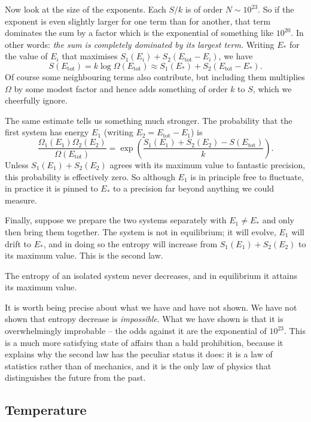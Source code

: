 \documentclass[a4paper]{scrartcl}
\begin{document}
Now look at the size of the exponents. Each $S/k$ is of order $N \sim 10^{23}$. So if the exponent is even slightly larger for one term than for another, that term dominates the sum by a factor which is the exponential of something like $10^{20}$. In other words: \emph{the sum is completely dominated by its largest term.} Writing $E_*$ for the value of $E_i$ that maximises $S_1(E_i) + S_2(E_{\mathrm{tot}} - E_i)$, we have
$$
S(E_{\mathrm{tot}}) = k\log \Omega(E_{\mathrm{tot}}) \approx S_1(E_*) + S_2(E_{\mathrm{tot}} - E_*).
$$
Of course some neighbouring terms also contribute, but including them multiplies $\Omega$ by some modest factor and hence adds something of order $k$ to $S$, which we cheerfully ignore.

The same estimate tells us something much stronger. The probability that the first system has energy $E_1$ (writing $E_2 = E_{\mathrm{tot}} - E_1$) is
$$
\frac{\Omega_1(E_1)\Omega_2(E_2)}{\Omega(E_{\mathrm{tot}})} = \exp\left( \frac{S_1(E_1) + S_2(E_2) - S(E_{\mathrm{tot}})}{k} \right).
$$
Unless $S_1(E_1) + S_2(E_2)$ agrees with its maximum value to fantastic precision, this probability is effectively zero. So although $E_1$ is in principle free to fluctuate, in practice it is pinned to $E_*$ to a precision far beyond anything we could measure.

Finally, suppose we prepare the two systems separately with $E_1 \neq E_*$ and only then bring them together. The system is not in equilibrium; it will evolve, $E_1$ will drift to $E_*$, and in doing so the entropy will increase from $S_1(E_1) + S_2(E_2)$ to its maximum value. This is the second law.

\begin{law}
	The entropy of an isolated system never decreases, and in equilibrium it attains its maximum value.
\end{law}

It is worth being precise about what we have and have not shown. We have not shown that entropy decrease is \emph{impossible}. What we have shown is that it is overwhelmingly improbable -- the odds against it are the exponential of $10^{23}$. This is a much more satisfying state of affairs than a bald prohibition, because it explains why the second law has the peculiar status it does: it is a law of statistics rather than of mechanics, and it is the only law of physics that distinguishes the future from the past.

\subsection{Temperature}
\end{document}

